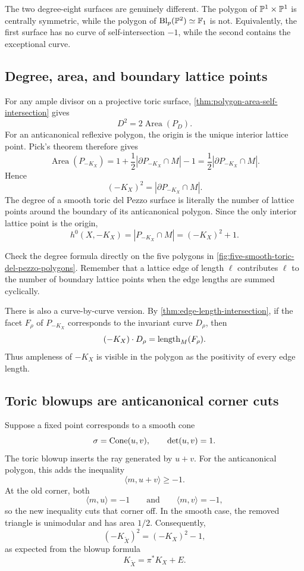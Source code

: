 The two degree-eight surfaces are genuinely different. The polygon of
\(\mathbb{P}^1\times\mathbb{P}^1\) is centrally symmetric, while the polygon of
\(\operatorname{Bl}_p(\mathbb{P}^2)\simeq\mathbb F_1\) is not. Equivalently, the first
surface has no curve of self-intersection \(-1\), while the second
contains the exceptional curve.

\subsection{Degree, area, and boundary lattice points}

For any ample divisor on a projective toric surface,
\cref{thm:polygon-area-self-intersection} gives
\[
D^2=2\operatorname{Area}(P_D).
\]
For an anticanonical reflexive polygon, the origin is the unique
interior lattice point. Pick's theorem therefore gives
\[
\operatorname{Area}(P_{-K_X})
=
1+\frac{1}{2}|\partial P_{-K_X}\cap M|-1
=
\frac{1}{2}|\partial P_{-K_X}\cap M|.
\]
Hence
\[
\boxed{
(-K_X)^2
=
|\partial P_{-K_X}\cap M|.
}
\]
The degree of a smooth toric del Pezzo surface is literally the number
of lattice points around the boundary of its anticanonical polygon.
Since the only interior lattice point is the origin,
\[
h^0(X,-K_X)
=
|P_{-K_X}\cap M|
=
(-K_X)^2+1.
\]

\begin{pauseandthink}
Check the degree formula directly on the five polygons in
\cref{fig:five-smooth-toric-del-pezzo-polygons}. Remember that a lattice
edge of length \(\ell\) contributes \(\ell\) to the number of boundary
lattice points when the edge lengths are summed cyclically.
\end{pauseandthink}

There is also a curve-by-curve version. By
\cref{thm:edge-length-intersection}, if the facet \(F_\rho\) of
\(P_{-K_X}\) corresponds to the invariant curve \(D_\rho\), then
\[
(-K_X)\cdot D_\rho
=
\operatorname{length}_M(F_\rho).
\]
Thus ampleness of \(-K_X\) is visible in the polygon as the positivity
of every edge length.

\subsection{Toric blowups are anticanonical corner cuts}

Suppose a fixed point corresponds to a smooth cone
\[
\sigma=\operatorname{Cone}(u,v),
\qquad
\det(u,v)=1.
\]
The toric blowup inserts the ray generated by \(u+v\). For the
anticanonical polygon, this adds the inequality
\[
\langle m,u+v\rangle\geq-1.
\]
At the old corner, both
\[
\langle m,u\rangle=-1
\qquad\text{and}\qquad
\langle m,v\rangle=-1,
\]
so the new inequality cuts that corner off. In the smooth case, the
removed triangle is unimodular and has area \(1/2\). Consequently,
\[
(-K_{\widetilde X})^2
=
(-K_X)^2-1,
\]
as expected from the blowup formula
\[
K_{\widetilde X}=\pi^*K_X+E.
\]

